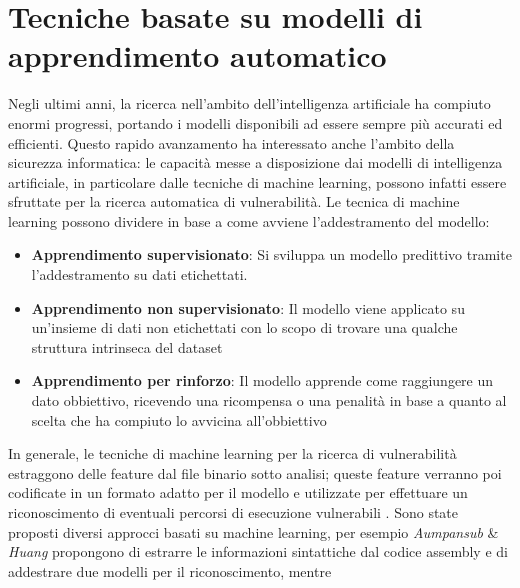 \documentclass[../main.tex]{subfiles}
\begin{document}
\section{Tecniche basate su modelli di apprendimento automatico}
Negli ultimi anni, la ricerca nell'ambito dell'intelligenza artificiale ha compiuto enormi progressi, portando i modelli disponibili ad essere
sempre più accurati ed efficienti. Questo rapido avanzamento ha interessato anche l'ambito della sicurezza informatica: le capacità messe a disposizione
dai modelli di intelligenza artificiale, in particolare dalle tecniche di machine learning, possono infatti essere sfruttate per la ricerca automatica di vulnerabilità.
Le tecnica di machine learning possono dividere in base a come avviene l'addestramento del modello:
\begin{itemize}
    \item \textbf{Apprendimento supervisionato}: Si sviluppa un modello predittivo tramite l'addestramento su dati etichettati.
    \item \textbf{Apprendimento non supervisionato}: Il modello viene applicato su un'insieme di dati non etichettati con lo scopo di trovare una qualche struttura intrinseca del dataset
    \item \textbf{Apprendimento per rinforzo}: Il modello apprende come raggiungere un dato obbiettivo, ricevendo una ricompensa o una penalità in base a quanto al scelta che ha compiuto lo avvicina all'obbiettivo
\end{itemize}
In generale, le tecniche di machine learning per la ricerca di vulnerabilità estraggono delle feature dal file binario sotto analisi; queste feature verranno poi codificate in un formato adatto per il modello e utilizzate per effettuare un riconoscimento
di eventuali percorsi di esecuzione vulnerabili \cite{ML_Survey}. Sono state proposti diversi approcci basati su machine learning, per esempio \textit{Aumpansub} \& \textit{Huang} \cite{ML1} propongono di estrarre le informazioni sintattiche dal codice assembly e di addestrare
due modelli per il riconoscimento, mentre 
\end{document}
